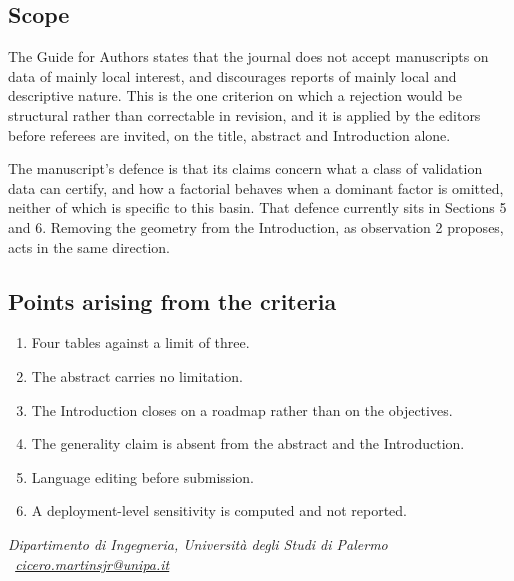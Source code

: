 \documentclass[11pt]{article}
\begin{document}
\subsection{Scope}

The Guide for Authors states that the journal does not accept manuscripts on
data of mainly local interest, and discourages reports of mainly local and
descriptive nature. This is the one criterion on which a rejection would be
structural rather than correctable in revision, and it is applied by the
editors before referees are invited, on the title, abstract and Introduction
alone.

The manuscript's defence is that its claims concern what a class of validation
data can certify, and how a factorial behaves when a dominant factor is
omitted, neither of which is specific to this basin. That defence currently
sits in Sections 5 and 6. Removing the geometry from the Introduction, as
observation 2 proposes, acts in the same direction.

\subsection{Points arising from the criteria}

\begin{enumerate}[leftmargin=1.5em, itemsep=0.15em]
  \item Four tables against a limit of three.
  \item The abstract carries no limitation.
  \item The Introduction closes on a roadmap rather than on the objectives.
  \item The generality claim is absent from the abstract and the Introduction.
  \item Language editing before submission.
  \item A deployment-level sensitivity is computed and not reported.
\end{enumerate}

\vspace{0.4em}
{\footnotesize\itshape Dipartimento di Ingegneria, Universit\`a degli Studi di
Palermo \textperiodcentered\
\href{mailto:cicero.martinsjr@unipa.it}{cicero.martinsjr@unipa.it}}
\end{document}
